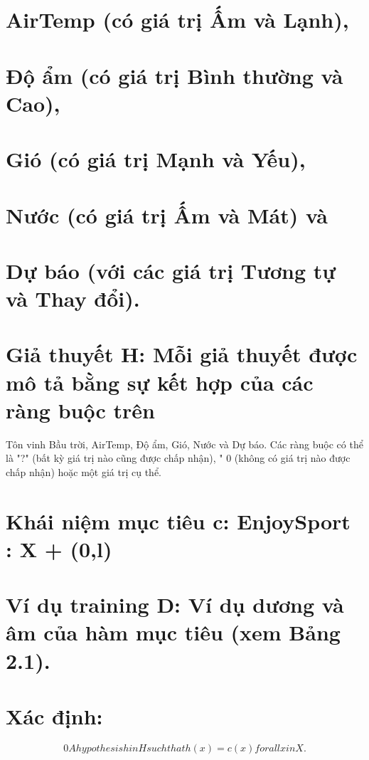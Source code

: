\section{AirTemp (có giá trị Ấm và Lạnh),}

\section{Độ ẩm (có giá trị Bình thường và Cao),}

\section{Gió (có giá trị Mạnh và Yếu),}

\section{Nước (có giá trị Ấm và Mát) và}

\section{Dự báo (với các giá trị Tương tự và Thay đổi).}

\section{Giả thuyết H: Mỗi giả thuyết được mô tả bằng sự kết hợp của các ràng buộc trên}

Tôn vinh Bầu trời, AirTemp, Độ ẩm, Gió, Nước và Dự báo. Các ràng buộc có thể là "?" (bất kỳ giá trị nào cũng được chấp nhận), " 0 (không có giá trị nào được chấp nhận) hoặc một giá trị cụ thể.

\section{Khái niệm mục tiêu c: EnjoySport : X + (0,l)}

\section{Ví dụ training D: Ví dụ dương và âm của hàm mục tiêu (xem Bảng 2.1).}

\section{Xác định:}

\[0 A hypothesis h in H such that h(x) = c(x) for all x in X.\]

